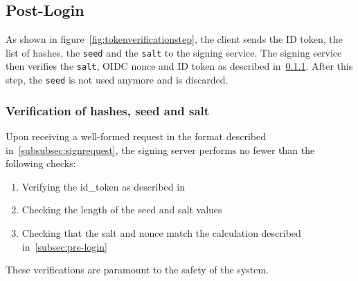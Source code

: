 \subsection{Post-Login}\label{subsec:post-login}
As shown in figure~\ref{fig:tokenverificationstep},
the client sends the ID token, the list of hashes, the \texttt{seed} and the \texttt{salt} to the signing service.
The signing service then verifies the \texttt{salt}, OIDC nonce and ID token as described in~\ref{subsubsec:verificationhashesseedsalt}.
After this step, the \texttt{seed} is not used anymore and is discarded.


\subsubsection{Verification of hashes, seed and salt}\label{subsubsec:verificationhashesseedsalt}
Upon receiving a well-formed request in the format described in~\ref{subsubsec:signrequest},
the signing server performs no fewer than the following checks:
\begin{enumerate}
    \item Verifying the id\_token as described in~\cite[Section~7.2]{rfc7519}
    \item Checking the length of the seed and salt values
    \item Checking that the salt and nonce match the calculation described in~\ref{subsec:pre-login}
\end{enumerate}
These verifications are paramount to the safety of the system.

